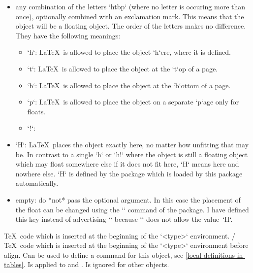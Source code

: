    \begin{itemize}
   \item any combination of the letters `htbp` (where no letter is occuring more than once), optionally combined with an exclamation mark.
     This means that the object will be a floating object.
     The order of the letters makes no difference.
     They have the following meanings:
     \begin{itemize}
     \item `h`: \LaTeX\ is allowed to place the object `h`ere, where it is defined.
     \item `t`: \LaTeX\ is allowed to place the object at the `t`op of a page.
     \item `b`: \LaTeX\ is allowed to place the object at the `b`ottom of a page.
     \item `p`: \LaTeX\ is allowed to place the object on a separate `p`age only for floats.
     \item `!`: 
     \end{itemize}
   \item `H`: \LaTeX\ places the object exactly here, no matter how unfitting that may be.
      In contrast to a single `h` or `h!` where the object is still a floating object which may float somewhere else if it does not fit here,
      `H` means here and nowhere else.
      `H` is defined by the  package which is loaded by this package automatically.
   \item empty: do *not* pass the optional argument.
     In this case the placement of the float can be changed using the `\floatplacement` command of the  package.
     I have defined this key instead of advertising `\floatplacement` because `\floatplacement` does not allow the value~`H`.
   \end{itemize}

  \TeX\ code which is inserted at the beginning of the `<type>` environment.
 /
  \TeX\ code which is inserted at the beginning of the `<type>` environment before align.
  Can be used to define a command for this object, see \cref{local-definitions-in-tables}.
  Is applied to  and .
  Is ignored for other objects.


